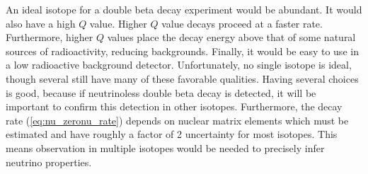\documentclass[herrin-thesis.tex]{subfiles}
\begin{document}
An ideal isotope for a double beta decay experiment would be abundant. It would also have a high \(Q\) value. Higher \(Q\) value decays proceed at a faster rate. Furthermore, higher \(Q\) values place the decay energy above that of some natural sources of radioactivity, reducing backgrounds. Finally, it would be easy to use in a low radioactive background detector. Unfortunately, no single isotope is ideal, though several still have many of these favorable qualities. Having several choices is good, because if neutrinoless double beta decay is detected, it will be important to confirm this detection in other isotopes. Furthermore, the decay rate (\cref{eq:nu_zeronu_rate}) depends on nuclear matrix elements which must be estimated and have roughly a factor of 2 uncertainty for most isotopes. This means observation in multiple isotopes would be needed to precisely infer neutrino properties.
\end{document}
